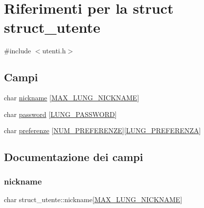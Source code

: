 \hypertarget{structstruct__utente}{}\section{Riferimenti per la struct struct\+\_\+utente}
\label{structstruct__utente}


{\ttfamily \#include $<$utenti.\+h$>$}

\subsection*{Campi}
\begin{DoxyCompactItemize}
\item 
char \hyperlink{structstruct__utente_a17f7559563292428017c36c15a59f3e2}{nickname} \mbox{[}\hyperlink{utenti_8h_aee9dc743fce11eb4208a44c1d59ef64c}{M\+A\+X\+\_\+\+L\+U\+N\+G\+\_\+\+N\+I\+C\+K\+N\+A\+ME}\mbox{]}
\item 
char \hyperlink{structstruct__utente_a14abeb6ac451fba14a8ea8c59df671ca}{password} \mbox{[}\hyperlink{utenti_8h_ad21198b3cb8d2fe2c3d8fb67746bf172}{L\+U\+N\+G\+\_\+\+P\+A\+S\+S\+W\+O\+RD}\mbox{]}
\item 
char \hyperlink{structstruct__utente_aa4baca77ad55655cb4fe134c6074e6a7}{preferenze} \mbox{[}\hyperlink{utenti_8h_afd3f4e6f098069fc2af012d2e454443a}{N\+U\+M\+\_\+\+P\+R\+E\+F\+E\+R\+E\+N\+ZE}\mbox{]}\mbox{[}\hyperlink{utenti_8h_a0fd5baff776b4f5be964c2f6383f415a}{L\+U\+N\+G\+\_\+\+P\+R\+E\+F\+E\+R\+E\+N\+ZA}\mbox{]}
\end{DoxyCompactItemize}


\subsection{Documentazione dei campi}
\mbox{\label{structstruct__utente_a17f7559563292428017c36c15a59f3e2}} 
\subsubsection{\texorpdfstring{nickname}{nickname}}
{\footnotesize\ttfamily char struct\+\_\+utente\+::nickname\mbox{[}\hyperlink{utenti_8h_aee9dc743fce11eb4208a44c1d59ef64c}{M\+A\+X\+\_\+\+L\+U\+N\+G\+\_\+\+N\+I\+C\+K\+N\+A\+ME}\mbox{]}}

\mbox{\label{structstruct__utente_a14abeb6ac451fba14a8ea8c59df671ca}} 
